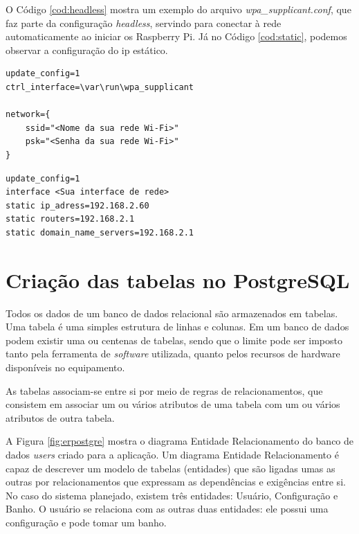 O Código \ref{cod:headless} mostra um exemplo do arquivo \textit{wpa\_supplicant.conf}, que faz parte da configuração \textit{headless}, servindo para conectar à rede automaticamente ao iniciar os Raspberry Pi. Já no Código \ref{cod:static}, podemos observar a configuração do ip estático.

\begin{lstlisting}[caption=Exemplo de configuração \textit{headless}, label=cod:headless]
update_config=1
ctrl_interface=\var\run\wpa_supplicant

network={
    ssid="<Nome da sua rede Wi-Fi>"
    psk="<Senha da sua rede Wi-Fi>"
}
\end{lstlisting}

\newpage

\begin{lstlisting}[caption=Exemplo de configuração do IP estático, label=cod:static]
update_config=1
interface <Sua interface de rede>
static ip_adress=192.168.2.60
static routers=192.168.2.1
static domain_name_servers=192.168.2.1
\end{lstlisting}



\section{Criação das tabelas no PostgreSQL}

Todos os dados de um banco de dados relacional são armazenados em tabelas. Uma tabela é uma simples estrutura de linhas e colunas. Em um banco de dados podem existir uma ou centenas de tabelas, sendo que o limite pode ser imposto tanto pela ferramenta de \textit{software} utilizada, quanto pelos recursos de hardware disponíveis no equipamento.

As tabelas associam-se entre si por meio de regras de relacionamentos, que consistem em associar um ou vários atributos de uma tabela com um ou vários atributos de outra tabela.

A Figura \ref{fig:erpostgre} mostra o diagrama Entidade Relacionamento do banco de dados \textit{users} criado para a aplicação. Um diagrama Entidade Relacionamento é capaz de descrever um modelo de tabelas (entidades) que são ligadas umas as outras por relacionamentos que expressam as dependências e exigências entre si. No caso do sistema planejado, existem três entidades: Usuário, Configuração e Banho. O usuário se relaciona com as outras duas entidades: ele possui uma configuração e pode tomar um banho.

